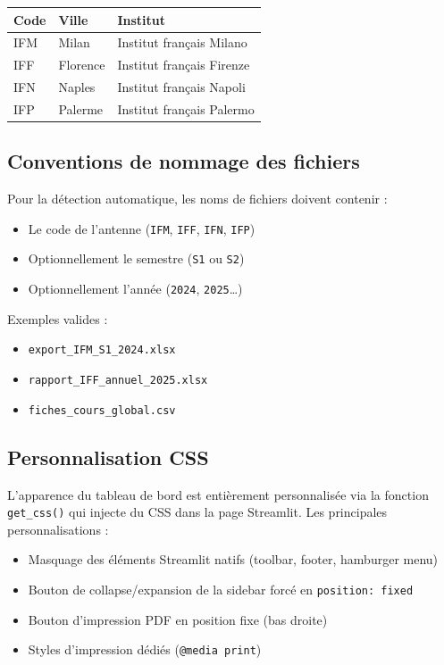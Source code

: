 \documentclass[12pt,a4paper,twoside]{article}
\begin{document}
\begin{center}
\begin{tabular}{lll}
\toprule
\textbf{Code} & \textbf{Ville} & \textbf{Institut} \\
\midrule
IFM & Milan & Institut fran\c{c}ais Milano \\
IFF & Florence & Institut fran\c{c}ais Firenze \\
IFN & Naples & Institut fran\c{c}ais Napoli \\
IFP & Palerme & Institut fran\c{c}ais Palermo \\
\bottomrule
\end{tabular}
\end{center}

\subsection{Conventions de nommage des fichiers}

Pour la d\'{e}tection automatique, les noms de fichiers doivent contenir :

\begin{itemize}[leftmargin=2em]
  \item Le code de l'antenne (\texttt{IFM}, \texttt{IFF}, \texttt{IFN}, \texttt{IFP})
  \item Optionnellement le semestre (\texttt{S1} ou \texttt{S2})
  \item Optionnellement l'ann\'{e}e (\texttt{2024}, \texttt{2025}\ldots)
\end{itemize}

Exemples valides :
\begin{itemize}[leftmargin=2em]
  \item \texttt{export\_IFM\_S1\_2024.xlsx}
  \item \texttt{rapport\_IFF\_annuel\_2025.xlsx}
  \item \texttt{fiches\_cours\_global.csv}
\end{itemize}

\subsection{Personnalisation CSS}

L'apparence du tableau de bord est enti\`{e}rement personnalis\'{e}e via la fonction \texttt{get\_css()} qui injecte du CSS dans la page Streamlit. Les principales personnalisations :

\begin{itemize}[leftmargin=2em]
  \item Masquage des \'{e}l\'{e}ments Streamlit natifs (toolbar, footer, hamburger menu)
  \item Bouton de collapse/expansion de la sidebar forc\'{e} en \texttt{position: fixed}
  \item Bouton d'impression PDF en position fixe (bas droite)
  \item Styles d'impression d\'{e}di\'{e}s (\texttt{@media print})
\end{itemize}
\end{document}
